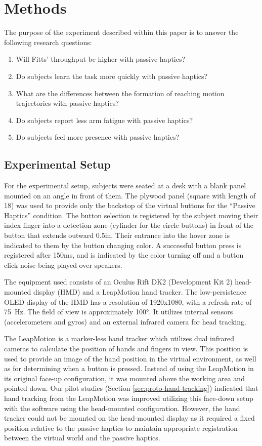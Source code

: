 \section{Methods}

The purpose of the experiment described within this paper is to answer the following research questions:

\begin{enumerate}
    \item Will Fitts' throughput be higher with passive haptics?
    \item Do subjects learn the task more quickly with passive haptics?
    \item What are the differences between the formation of reaching motion trajectories with passive haptics?
    \item Do subjects report less arm fatigue with passive haptics?
    \item Do subjects feel more presence with passive haptics?
\end{enumerate}

\subsection{Experimental Setup}

For the experimental setup, subjects were seated at a desk with a blank panel mounted on an angle in front of them.
The plywood panel (square with length of \SI{18}{\inch}) was used to provide only the backstop of the virtual buttons for the ``Passive Haptics'' condition.
The button selection is registered by the subject moving their index finger into a detection zone (cylinder for the circle buttons) in front of the button that extends outward 0.5in.
Their entrance into the hover zone is indicated to them by the button changing color.
A successful button press is registered after 150ms, and is indicated by the color turning off and a button click noise being played over speakers.

The equipment used consists of an Oculus Rift DK2 (Development Kit 2) head-mounted display (HMD) and a LeapMotion hand tracker.
The low-persistence OLED display of the HMD has a resolution of 1920x1080, with a refresh rate of \SI{75}{\hertz}.
The field of view is approximately \ang{100}.
It utilizes internal sensors (accelerometers and gyros) and an external infrared camera for head tracking.

The LeapMotion is a marker-less hand tracker which utilizes dual infrared cameras to calculate the position of hands and fingers in view.
This position is used to provide an image of the hand position in the virtual environment, as well as for determining when a button is pressed.
Instead of using the LeapMotion in its original face-up configuration, it was mounted above the working area and pointed down.
Our pilot studies (Section \ref{sec:proto-hand-tracking}) indicated that hand tracking from the LeapMotion was improved utilizing this face-down setup with the software using the head-mounted configuration.
However, the hand tracker could not be mounted on the head-mounted display as it required a fixed position relative to the passive haptics to maintain appropriate registration between the virtual world and the passive haptics.

